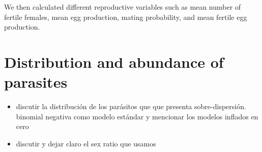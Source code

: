 \documentclass[12pt,a4paper]{article}
\theoremstyle{plain}%
\theoremstyle{definition}
\theoremstyle{remark}
\begin{document}
	
	We then calculated different reproductive variables such as mean number of fertile females, mean egg production, mating probability, and mean fertile egg production.
	
	
	
	
%	

\section{Distribution and abundance of parasites}
\begin{itemize}
	\item discutir la distribución de los parásitos que que presenta sobre-dispersión. binomial negativa como modelo estándar y mencionar los modelos inflados en cero  
	\item discutir y dejar claro el sex ratio que usamos
\end{itemize}
	
\end{document}

